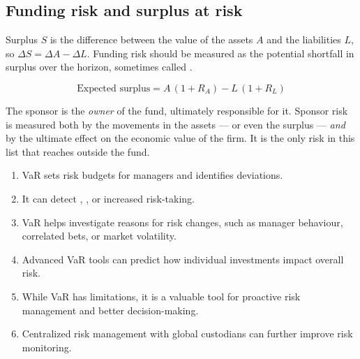 \subsection{Funding risk and surplus at risk}

Surplus $S$ is the difference between the value of the assets $A$ and the
liabilities $L$, so $\Delta S = \Delta A - \Delta L$. Funding risk should be
measured as the potential shortfall in surplus over the horizon, sometimes called
.

\begin{imfmlbox}
\[ \text{Expected surplus} = A\,(1 + R_A) - L\,(1 + R_L) \]
\end{imfmlbox}

\begin{imtrapbox}[breakable=false,title={Sponsor risk is measured twice over}]
The sponsor is the \emph{owner} of the fund, ultimately responsible for it.
Sponsor risk is measured both by the movements in the assets --- or even the
surplus --- \emph{and} by the ultimate effect on the economic value of the firm.
It is the only risk in this list that reaches outside the fund.
\end{imtrapbox}


\begin{enumerate}
\item VaR sets risk budgets for managers and identifies deviations.
\item It can detect , , or
increased risk-taking.
\item VaR helps investigate reasons for risk changes, such as manager behaviour,
correlated bets, or market volatility.
\item Advanced VaR tools can predict how individual investments impact overall
risk.
\item While VaR has limitations, it is a valuable tool for proactive risk
management and better decision-making.
\item Centralized risk management with global custodians can further improve risk
monitoring.
\end{enumerate}

